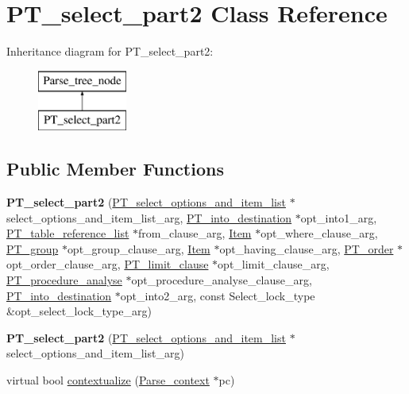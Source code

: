 \hypertarget{classPT__select__part2}{}\section{P\+T\+\_\+select\+\_\+part2 Class Reference}
\label{classPT__select__part2}
Inheritance diagram for P\+T\+\_\+select\+\_\+part2\+:\begin{figure}[H]
\begin{center}
\leavevmode
\includegraphics[height=2.000000cm]{classPT__select__part2}
\end{center}
\end{figure}
\subsection*{Public Member Functions}
\begin{DoxyCompactItemize}
\item 
\mbox{\label{classPT__select__part2_a106ee918bbf50ca38ee4a97e8f092d76}} 
{\bfseries P\+T\+\_\+select\+\_\+part2} (\mbox{\hyperlink{classPT__select__options__and__item__list}{P\+T\+\_\+select\+\_\+options\+\_\+and\+\_\+item\+\_\+list}} $\ast$select\+\_\+options\+\_\+and\+\_\+item\+\_\+list\+\_\+arg, \mbox{\hyperlink{classPT__into__destination}{P\+T\+\_\+into\+\_\+destination}} $\ast$opt\+\_\+into1\+\_\+arg, \mbox{\hyperlink{classPT__table__reference__list}{P\+T\+\_\+table\+\_\+reference\+\_\+list}} $\ast$from\+\_\+clause\+\_\+arg, \mbox{\hyperlink{classItem}{Item}} $\ast$opt\+\_\+where\+\_\+clause\+\_\+arg, \mbox{\hyperlink{classPT__group}{P\+T\+\_\+group}} $\ast$opt\+\_\+group\+\_\+clause\+\_\+arg, \mbox{\hyperlink{classItem}{Item}} $\ast$opt\+\_\+having\+\_\+clause\+\_\+arg, \mbox{\hyperlink{classPT__order}{P\+T\+\_\+order}} $\ast$opt\+\_\+order\+\_\+clause\+\_\+arg, \mbox{\hyperlink{classPT__limit__clause}{P\+T\+\_\+limit\+\_\+clause}} $\ast$opt\+\_\+limit\+\_\+clause\+\_\+arg, \mbox{\hyperlink{classPT__procedure__analyse}{P\+T\+\_\+procedure\+\_\+analyse}} $\ast$opt\+\_\+procedure\+\_\+analyse\+\_\+clause\+\_\+arg, \mbox{\hyperlink{classPT__into__destination}{P\+T\+\_\+into\+\_\+destination}} $\ast$opt\+\_\+into2\+\_\+arg, const Select\+\_\+lock\+\_\+type \&opt\+\_\+select\+\_\+lock\+\_\+type\+\_\+arg)
\item 
\mbox{\label{classPT__select__part2_ac12cc793740405057ac59616ca25c3d6}} 
{\bfseries P\+T\+\_\+select\+\_\+part2} (\mbox{\hyperlink{classPT__select__options__and__item__list}{P\+T\+\_\+select\+\_\+options\+\_\+and\+\_\+item\+\_\+list}} $\ast$select\+\_\+options\+\_\+and\+\_\+item\+\_\+list\+\_\+arg)
\item 
virtual bool \mbox{\hyperlink{classPT__select__part2_aa5b6953b68fed0bc91a7d626db111f78}{contextualize}} (\mbox{\hyperlink{structParse__context}{Parse\+\_\+context}} $\ast$pc)
\end{DoxyCompactItemize}
